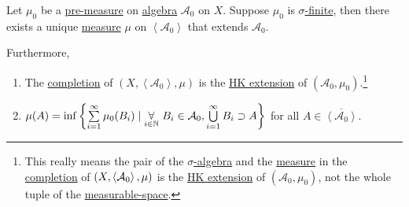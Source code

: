 \begin{corollary}\label{col:lec-6}
	Let \(\mu _0\) be a \hyperref[def:pre-measure]{pre-measure} on \hyperref[def:algebra]{algebra} \(\mathcal{A} _0\) on \(X\). Suppose \(\mu _0\) is
	\hyperref[def:finite-measure]{\(\sigma \)-finite}, then there exists a unique \hyperref[def:measure]{measure} \(\mu\) on \(\left< \mathcal{A} _0 \right> \)
	that extends \(\mathcal{A} _0\).

	Furthermore,
	\begin{enumerate}[(1)]
		\item The \hyperref[def:complete-measure-space]{completion} of \((X, \left< \mathcal{A} _0 \right>, \mu  )\) is the \hyperref[def:HK-extension]{HK extension} of
		      \((\mathcal{A} _0, \mu _0)\).\footnote{This really means the pair of the \hyperref[def:sigma-algebra]{\(\sigma\)-algebra} and the \hyperref[def:measure]{measure} in
			      the \hyperref[def:complete]{completion} of \((X, \left< \mathcal{\MakeUppercase{a}} _0 \right>, \mu  )\) is the \hyperref[def:HK-extension]{HK extension} of \((\mathcal{A} _0, \mu _0)\),
			      not the whole tuple of the \hyperref[def:measurable-space]{measurable-space}.}
		\item \(\mu (A) = \inf\left\{\sum\limits_{i=1}^{\infty} \mu _0(B_{i})\mid \underset{i\in\mathbb{\MakeUppercase{N}} }{\forall}\ B_{i}\in \mathcal{A} _0, \bigcup\limits_{i=1}^{\infty} B_{i}\supset A\right\}\)
		      for all \(A\in \overline{\left< \mathcal{A} _0 \right> }\).
	\end{enumerate}
\end{corollary}